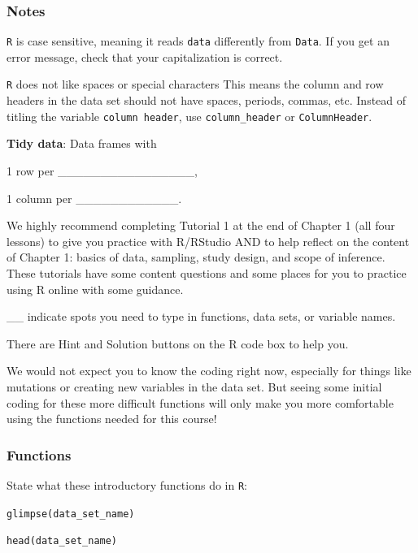 \documentclass[
]{report}
\newcommand{\rgi}{\hspace{24pt}}  %
\begin{document}

\hypertarget{notes-3}{%
\subsubsection*{Notes}\label{notes-3}}

\texttt{R} is case sensitive, meaning it reads \texttt{data} differently from \texttt{Data}. If you get an error message, check that your capitalization is correct.

\texttt{R} does not like spaces or special characters This means the column and row headers in the data set should not have spaces, periods, commas, etc. Instead of titling the variable \texttt{column\ header}, use \texttt{column\_header} or \texttt{ColumnHeader}.

\textbf{Tidy data}: Data frames with

\rgi 1 row per \_\_\_\_\_\_\_\_\_\_\_\_\_\_\_\_,

\rgi 1 column per \_\_\_\_\_\_\_\_\_\_\_\_.

We highly recommend completing Tutorial 1 at the end of Chapter 1 (all four lessons) to give you practice with R/RStudio AND to help reflect on the content of Chapter 1: basics of data, sampling, study design, and scope of inference. These tutorials have some content questions and some places for you to practice using R online with some guidance.

\rgi \_\_ indicate spots you need to type in functions, data sets, or variable names.

\rgi There are Hint and Solution buttons on the R code box to help you.

We would not expect you to know the coding right now, especially for things like mutations or creating new variables in the data set. But seeing some initial coding for these more difficult functions will only make you more comfortable using the functions needed for this course!

\hypertarget{functions}{%
\subsubsection*{Functions}\label{functions}}

State what these introductory functions do in \texttt{R}:

\texttt{glimpse(data\_set\_name)}

\texttt{head(data\_set\_name)}
\end{document}
